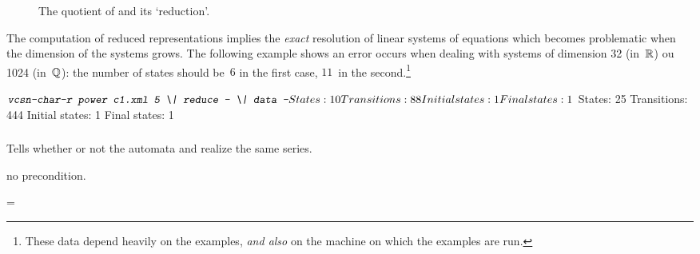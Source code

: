 \begin{figure}[ht]
\caption{The quotient of  and its `reduction'.}
\label{fig:red-bad}
\end{figure}


\thii
The computation of reduced representations implies the \emph{exact} 
resolution of  
linear systems of equations which becomes problematic when the 
dimension of the systems grows. 
The following example shows an error occurs when dealing with systems 
of dimension 32 (in~$\mathbb{R}$) ou 1024 (in~$\mathbb{Q}$): the number of states 
should be~$6$ in the first case, $11$~in the second.\footnote{%
   These data depend heavily on the examples, \emph{and also} on the machine on 
   which the examples are run.}

\begin{shell}
$ \kbd{vcsn-char-r power c1.xml 5 \bslash| reduce -  \bslash| data -}
States: 10
Transitions: 88
Initial states: 1
Final states: 1
$ 
States: 25
Transitions: 444
Initial states: 1
Final states: 1
\end{shell}%


\subsubsection{}
\SetTwClPrm{\TwClOne}%

\begin{SwClCmd}
%
\end{SwClCmd}%
\begin{SwClTxt}
    Tells whether or not the automata   and  
    realize the same series. 
\end{SwClTxt}%

\Prec no precondition.

\Spec
{} =\\  
\e{}

%



